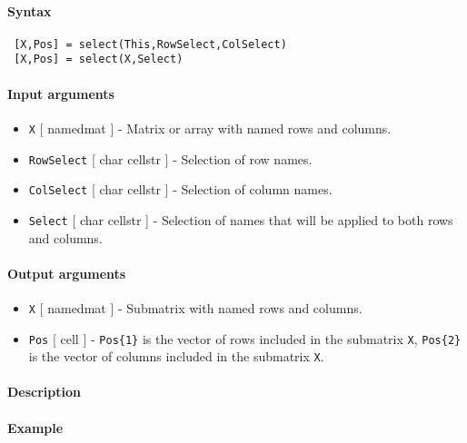 


	\paragraph{Syntax}
 
 \begin{verbatim}
 [X,Pos] = select(This,RowSelect,ColSelect)
 [X,Pos] = select(X,Select)
 \end{verbatim}
 
 \paragraph{Input arguments}
 
 \begin{itemize}
 \item
   \texttt{X} {[} namedmat {]} - Matrix or array with named rows and
   columns.
 \item
   \texttt{RowSelect} {[} char \textbar{} cellstr {]} - Selection of row
   names.
 \item
   \texttt{ColSelect} {[} char \textbar{} cellstr {]} - Selection of
   column names.
 \item
   \texttt{Select} {[} char \textbar{} cellstr {]} - Selection of names
   that will be applied to both rows and columns.
 \end{itemize}
 
 \paragraph{Output arguments}
 
 \begin{itemize}
 \item
   \texttt{X} {[} namedmat {]} - Submatrix with named rows and columns.
 \item
   \texttt{Pos} {[} cell {]} - \texttt{Pos\{1\}} is the vector of rows
   included in the submatrix \texttt{X}, \texttt{Pos\{2\}} is the vector
   of columns included in the submatrix \texttt{X}.
 \end{itemize}
 
 \paragraph{Description}
 
 \paragraph{Example}


